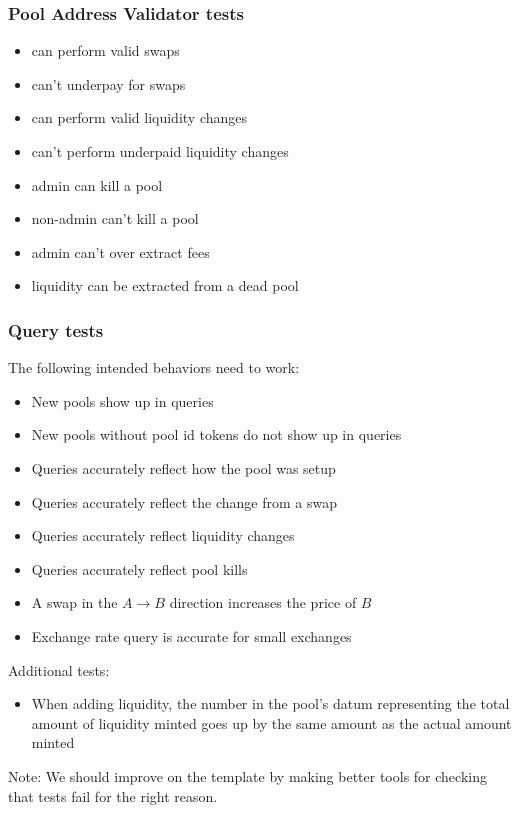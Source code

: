 \documentclass{article}
\begin{document}
\subsubsection{Pool Address Validator tests}

\begin{itemize}
	\item can perform valid swaps
	\item can't underpay for swaps
	\item can perform valid liquidity changes
	\item can't perform underpaid liquidity changes
	\item admin can kill a pool
	\item non-admin can't kill a pool
	\item admin can't over extract fees
	\item liquidity can be extracted from a dead pool
\end{itemize}

\subsubsection{Query tests}

The following intended behaviors need to work:
\begin{itemize}
	\item New pools show up in queries
	\item New pools without pool id tokens do not show up in queries
	\item Queries accurately reflect how the pool was setup
	\item Queries accurately reflect the change from a swap
	\item Queries accurately reflect liquidity changes
	\item Queries accurately reflect pool kills
	\item A swap in the $A \rightarrow B$ direction increases the price of $B$
	\item Exchange rate query is accurate for small exchanges
\end{itemize}

Additional tests:
\begin{itemize}
	\item When adding liquidity, the number in the pool's datum representing the
    total amount of liquidity minted goes up by the same amount as the actual amount minted
\end{itemize}

Note: We should improve on the template by making better tools for checking that tests fail for the right reason.
\end{document}
